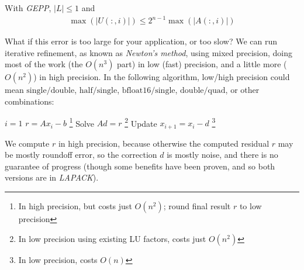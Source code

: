 \documentclass[11pt]{article}
\numberwithin{equation}{section}
\begin{document}
\begin{theorem}
    With \textit{GEPP}, $|L| \leq 1$ and \begin{align*}
        \max(|U(:,i)|) \leq 2^{n-1} \max(|A(:,i)|)
    \end{align*}
\end{theorem}

What if this error is too large for your application, or too slow? We can run iterative refinement, as known as \textit{Newton's method}, using mixed precision, 
doing most of the work (the $O(n^3)$ part) in low (fast) precision, and a little more ($O(n^2)$) in high precision. In the following algorithm, 
low/high precision could mean $\mathrm{single}/\mathrm{double}$, $\mathrm{half}/\mathrm{single}$, $\mathrm{bfloat16}/\mathrm{single}$, $\mathrm{double}/\mathrm{quad}$, or other combinations:

\begin{savenotes}
    \begin{algorithmfrm}[Do GEPP to solve $Ax=b$ in low precision]
        \begin{algorithmic}[1]
            \State $i=1$
                \State $r=Ax_i-b$ \footnote{In high precision, but costs just $O(n^2)$; round final result $r$ to low precision}
                \State Solve $Ad=r$ \footnote{In low precision using existing LU factors, costs just $O(n^2)$}
                \State Update $x_{i+1}=x_i-d$ \footnote{In low precision, costs $O(n)$}
            \EndWhile
        \end{algorithmic}
    \end{algorithmfrm}
\end{savenotes}

We compute $r$ in high precision, because otherwise the computed residual $r$ may be mostly roundoff error, 
so the correction $d$ is mostly noise, and there is no guarantee of progress (though some benefits have been proven, and so both versions are in \textit{LAPACK}).
\end{document}

